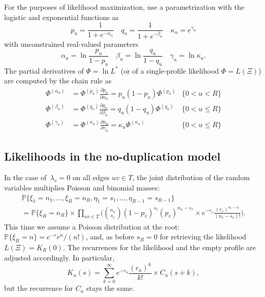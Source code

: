 \documentclass{elsarticle}
\newcommand{\PROB}{\mathbb{P}}
\newcommand{\nlik}{C}
\newcommand{\slik}{K}
\newcommand{\nx}{u}
\newcommand{\ny}{v}
\newcommand{\troot}{R}
\newcommand{\fdf}{\Phi}
\begin{document}
For the purposes of likelihood maximization, use a 
parametrization  with the logistic and exponential functions as  
\[
p_{\nx} = \frac{1}{1+e^{-\alpha_{\nx}}}
\quad 
q_{\nx} = \frac{1}{1+e^{-\beta_{\nx}}} 
\quad
\kappa_{\nx} = e^{\gamma_{\nx}}
\]
with unconstrained real-valued parameters 
\[
\alpha_{\nx}=\ln \frac{p_{\nx}}{1-p_{\nx}}
\quad 
\beta_{\nx}=\ln \frac{q_{\nx}}{1-q_{\nx}}
\quad 
\gamma_{\nx}=\ln \kappa_{\nx}.
\]
The partial derivatives of $\fdf=\ln L^*$ (or of a single-profile likelihood $\fdf=L(\Xi)$)
are computed by the chain rule as 
\begin{align*}
\fdf^{(\alpha_{\nx})} & = \fdf^{(p_{\nx})}\frac{\partial p_{\nx}}{\partial \alpha_{\nx}}
	= p_{\nx}(1-p_{\nx}) \fdf^{(p_{\nx})} & \{0<\nx<R\}
\\
\fdf^{(\beta_{\nx})} & = \fdf^{(q_{\nx})}\frac{\partial q_{\nx}}{\partial \beta_{\nx}}
	= q_{\nx}(1-q_{\nx}) \fdf^{(q_{\nx})} & \{0<\nx\le R\}
\\
\fdf^{(\gamma_{\nx})} & = \fdf^{(\kappa_{\nx})}\frac{\partial \kappa_{\nx}}{\partial \gamma_{\nx}}
	= \kappa_{\nx} \fdf^{(\kappa_{\nx})} & \{0<\nx\le R\}
\end{align*}

\subsection{Likelihoods in the no-duplication model}
In the case of~$\lambda_{\ny}=0$ on all edges $\nx\ny\in T$, 
the joint distribution of the random variables multiplies Poisson
and binomial masses: 
\begin{multline*}
\PROB\{\xi_1=n_1,\dotsc,\xi_{\troot}=n_{\troot}, \eta_1=s_1,\dotsc, \eta_{R-1}=s_{R-1}\}
\\
 = \PROB\{\xi_{\troot}=n_{\troot}\}
  \times 
 \prod_{\nx\ny\in T}
 	\biggl( 
 	\binom{n_{\nx}}{s_{\ny}} (1-p_{\ny})^{s_{\ny}} (p_{\ny})^{n_{\nx}-s_{\ny}}
 	\times 
 	e^{-r_{\ny}} \frac{(r_{\ny})^{n_{\ny}-s_{\ny}}}{(n_{\ny}-s_{\ny})!}
 	\biggr).
\end{multline*}
This time we assume a Poisson distribution at the root: $\PROB\{\xi_{\troot} =n\} = e^{-r} r^n/(n!)$, 
and, as before $s_{\troot} =0$ for retrieving the likelihood $L(\Xi)=\slik_{\troot}(0)$.   
The recurrences for the likelihood and the empty profile are adjusted accordingly. 
In particular, 
\begin{equation}\label{eq:slik.rec.poisson}
\slik_{\nx}(s) = \sum_{k=0}^{\infty} e^{-r_{\nx}}\frac{(r_{\nx})^k}{k!} \times \nlik_{\nx}(s+k),
\end{equation}
but the recurrence for $\nlik_{\nx}$ stays the same. 
\end{document}
